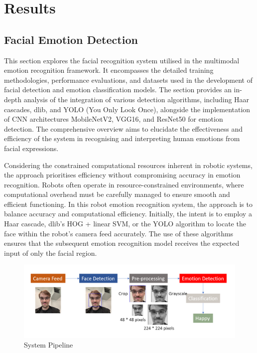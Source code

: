 \chapter{Results}
\section{Facial Emotion Detection}

This section explores the facial recognition system utilised in the multimodal emotion recognition framework. It encompasses the detailed training methodologies, performance evaluations, and datasets used in the development of facial detection and emotion classification models. The section provides an in-depth analysis of the integration of various detection algorithms, including Haar cascades, dlib, and YOLO (You Only Look Once), alongside the implementation of CNN architectures MobileNetV2, VGG16, and ResNet50 for emotion detection. The comprehensive overview aims to elucidate the effectiveness and efficiency of the system in recognising and interpreting human emotions from facial expressions.

Considering the constrained computational resources inherent in robotic systems, the approach prioritises efficiency without compromising accuracy in emotion recognition. Robots often operate in resource-constrained environments, where computational overhead must be carefully managed to ensure smooth and efficient functioning. In this robot emotion recognition system, the approach is to balance accuracy and computational efficiency. Initially, the intent is to employ a Haar cascade, dlib's HOG + linear SVM, or the YOLO algorithm to locate the face within the robot's camera feed accurately. The use of these algorithms ensures that the subsequent emotion recognition model receives the expected input of only the facial region.

\begin{figure}[!htb]
    \centering{}
    \includegraphics[scale=0.35]{fed_images/pipeline.png}
    \caption{System Pipeline}
    \label{figure:pipeline}
\end{figure}

